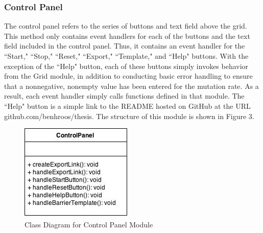 \documentclass[12pt]{article}
\begin{document}
\begin{spacing}{1.6}
\subsubsection{Control Panel}
The control panel refers to the series of buttons and text field above the grid. This method only contains event handlers for each of the buttons and the text field included in the control panel. Thus, it contains an event handler for the ``Start," ``Stop," ``Reset," ``Export," ``Template," and ``Help" buttons. With the exception of the ``Help" button, each of these buttons simply invokes behavior from the Grid module, in addition to conducting basic error handling to ensure that a nonnegative, nonempty value has been entered for the mutation rate. As a result, each event handler simply calls functions defined in that module. The ``Help" button is a simple link to the README hosted on GitHub at the URL github.com/benhroos/thesis. The structure of this module is shown in Figure 3.
\begin{figure}[h]
\caption{Class Diagram for Control Panel Module}
\centering
\includegraphics[scale=0.5]{control-panel-class-diagram}
\end{figure}


\end{spacing}
\end{document}
